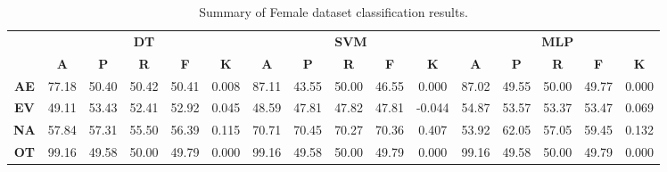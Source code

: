 \begin{landscape}
\begin{table}[htbp]
\footnotesize
\centering
\caption{Summary of Female dataset classification results.}
\label{tab:base_female}
\begin{tabular}{|c|c|c|c|c|c|c|c|c|c|c|c|c|c|c|c|}
\hline
\multirow{2}{*}{}	& \multicolumn{5}{c|}{\textbf{DT}}												& \multicolumn{5}{c|}{\textbf{SVM}}												& \multicolumn{5}{c|}{\textbf{MLP}}												\\ \cline{2-16} 
					& \textbf{A}	& \textbf{P}	& \textbf{R}	& \textbf{F}	& \textbf{K}	& \textbf{A}	& \textbf{P}	& \textbf{R}	& \textbf{F}	& \textbf{K}	& \textbf{A}	& \textbf{P}	& \textbf{R}	& \textbf{F}	& \textbf{K}	\\ \hline
\textbf{AE}			& 77.18			& 50.40			& 50.42			& 50.41			& 0.008			& 87.11			& 43.55			& 50.00			& 46.55			& 0.000			& 87.02			& 49.55			& 50.00			& 49.77			& 0.000			\\ \hline
\textbf{EV}			& 49.11			& 53.43			& 52.41			& 52.92			& 0.045			& 48.59			& 47.81			& 47.82			& 47.81			& -0.044			& 54.87			& 53.57			& 53.37			& 53.47			& 0.069			\\ \hline
\textbf{NA}			& 57.84			& 57.31			& 55.50			& 56.39			& 0.115			& 70.71			& 70.45			& 70.27			& 70.36			& 0.407			& 53.92			& 62.05			& 57.05			& 59.45			& 0.132			\\ \hline
\textbf{OT}			& 99.16			& 49.58			& 50.00			& 49.79			& 0.000			& 99.16			& 49.58			& 50.00			& 49.79			& 0.000			& 99.16			& 49.58			& 50.00			& 49.79			& 0.000			\\ \hline
\end{tabular}
\end{table}
\end{landscape}